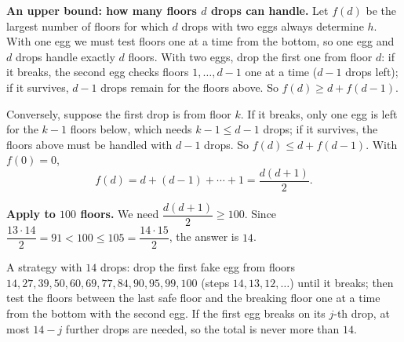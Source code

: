 \textbf{An upper bound: how many floors $d$ drops can handle.} Let $f(d)$ be the largest number of floors for which $d$ drops with two eggs always determine $h$. With one egg we must test floors one at a time from the bottom, so one egg and $d$ drops handle exactly $d$ floors. With two eggs, drop the first one from floor $d$: if it breaks, the second egg checks floors $1,\dots,d-1$ one at a time ($d-1$ drops left); if it survives, $d-1$ drops remain for the floors above. So $f(d)\ge d+f(d-1)$.

Conversely, suppose the first drop is from floor $k$. If it breaks, only one egg is left for the $k-1$ floors below, which needs $k-1\le d-1$ drops; if it survives, the floors above must be handled with $d-1$ drops. So $f(d)\le d+f(d-1)$. With $f(0)=0$,
\[
f(d)=d+(d-1)+\cdots+1=\dfrac{d(d+1)}{2}.
\]

\textbf{Apply to $100$ floors.} We need $\dfrac{d(d+1)}{2}\ge100$. Since $\dfrac{13\cdot14}{2}=91<100\le105=\dfrac{14\cdot15}{2}$, the answer is $\boxed{14}$.

A strategy with $14$ drops: drop the first fake egg from floors $14,27,39,50,60,69,77,84,90,95,99,100$ (steps $14,13,12,\dots$) until it breaks; then test the floors between the last safe floor and the breaking floor one at a time from the bottom with the second egg. If the first egg breaks on its $j$-th drop, at most $14-j$ further drops are needed, so the total is never more than $14$.
